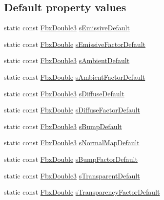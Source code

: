 \subsection*{Default property values}
\begin{DoxyCompactItemize}
\item 
static const \hyperlink{fbxtypes_8h_ae0a96f14cde566774c7553aa7523b7a7}{Fbx\+Double3} \hyperlink{class_fbx_surface_lambert_ab7b16ef82579f187ac34a848ed7c3f2c}{s\+Emissive\+Default}
\item 
static const \hyperlink{fbxtypes_8h_a171e72a1c46fc15c1a6c9c31948c1c5b}{Fbx\+Double} \hyperlink{class_fbx_surface_lambert_ab78ce09bd0d0f9009da7f254b26e4ec2}{s\+Emissive\+Factor\+Default}
\item 
static const \hyperlink{fbxtypes_8h_ae0a96f14cde566774c7553aa7523b7a7}{Fbx\+Double3} \hyperlink{class_fbx_surface_lambert_adfa8c3d2c37f85133f85da30434cc084}{s\+Ambient\+Default}
\item 
static const \hyperlink{fbxtypes_8h_a171e72a1c46fc15c1a6c9c31948c1c5b}{Fbx\+Double} \hyperlink{class_fbx_surface_lambert_aaff9847a26203491fd997d015b83c32a}{s\+Ambient\+Factor\+Default}
\item 
static const \hyperlink{fbxtypes_8h_ae0a96f14cde566774c7553aa7523b7a7}{Fbx\+Double3} \hyperlink{class_fbx_surface_lambert_a6dac1957d6358d908598ceaf449a96e6}{s\+Diffuse\+Default}
\item 
static const \hyperlink{fbxtypes_8h_a171e72a1c46fc15c1a6c9c31948c1c5b}{Fbx\+Double} \hyperlink{class_fbx_surface_lambert_a5ce0de5eff6ed3da9736fca7fa1bac1a}{s\+Diffuse\+Factor\+Default}
\item 
static const \hyperlink{fbxtypes_8h_ae0a96f14cde566774c7553aa7523b7a7}{Fbx\+Double3} \hyperlink{class_fbx_surface_lambert_a01c993fda940a303bff4cc04baa98d6c}{s\+Bump\+Default}
\item 
static const \hyperlink{fbxtypes_8h_ae0a96f14cde566774c7553aa7523b7a7}{Fbx\+Double3} \hyperlink{class_fbx_surface_lambert_a886d15757ee8fe3486b20188de717f83}{s\+Normal\+Map\+Default}
\item 
static const \hyperlink{fbxtypes_8h_a171e72a1c46fc15c1a6c9c31948c1c5b}{Fbx\+Double} \hyperlink{class_fbx_surface_lambert_aacf300d28b17e419c84602dd5b158a22}{s\+Bump\+Factor\+Default}
\item 
static const \hyperlink{fbxtypes_8h_ae0a96f14cde566774c7553aa7523b7a7}{Fbx\+Double3} \hyperlink{class_fbx_surface_lambert_a3f8a4e314c88128d1bf42576906c06ca}{s\+Transparent\+Default}
\item 
static const \hyperlink{fbxtypes_8h_a171e72a1c46fc15c1a6c9c31948c1c5b}{Fbx\+Double} \hyperlink{class_fbx_surface_lambert_a278f5490e2d246ab9bd26d22a0f79cdc}{s\+Transparency\+Factor\+Default}

\end{DoxyCompactItemize}
